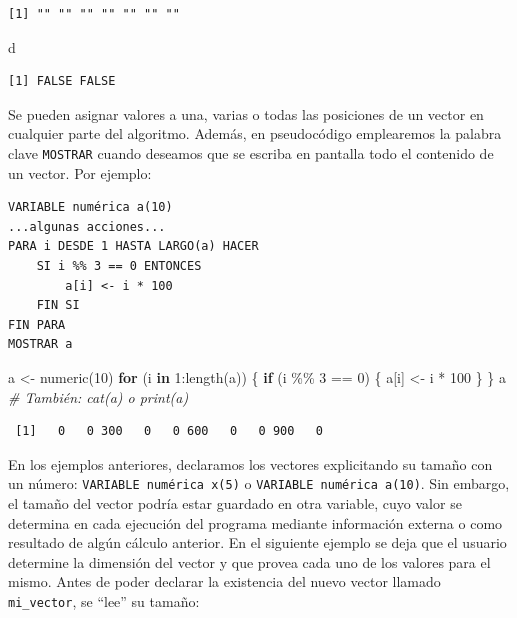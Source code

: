 \documentclass[
]{book}
\newenvironment{Shaded}{\begin{snugshade}}{\end{snugshade}}
\newcommand{\CommentTok}[1]{\textcolor[rgb]{0.56,0.35,0.01}{\textit{#1}}}
\newcommand{\ControlFlowTok}[1]{\textcolor[rgb]{0.13,0.29,0.53}{\textbf{#1}}}
\newcommand{\DecValTok}[1]{\textcolor[rgb]{0.00,0.00,0.81}{#1}}
\newcommand{\FunctionTok}[1]{\textcolor[rgb]{0.00,0.00,0.00}{#1}}
\newcommand{\NormalTok}[1]{#1}
\newcommand{\OtherTok}[1]{\textcolor[rgb]{0.56,0.35,0.01}{#1}}
\newcommand{\SpecialCharTok}[1]{\textcolor[rgb]{0.00,0.00,0.00}{#1}}
\begin{document}
\begin{verbatim}
[1] "" "" "" "" "" "" ""
\end{verbatim}

\begin{Shaded}
\begin{Highlighting}[]
\NormalTok{d}
\end{Highlighting}
\end{Shaded}

\begin{verbatim}
[1] FALSE FALSE
\end{verbatim}

Se pueden asignar valores a una, varias o todas las posiciones de un vector en cualquier parte del algoritmo. Además, en pseudocódigo emplearemos la palabra clave \texttt{MOSTRAR} cuando deseamos que se escriba en pantalla todo el contenido de un vector. Por ejemplo:

\begin{verbatim}
VARIABLE numérica a(10)
...algunas acciones...
PARA i DESDE 1 HASTA LARGO(a) HACER
    SI i %% 3 == 0 ENTONCES  
        a[i] <- i * 100
    FIN SI
FIN PARA
MOSTRAR a
\end{verbatim}

\begin{Shaded}
\begin{Highlighting}[]
\NormalTok{a }\OtherTok{\textless{}{-}} \FunctionTok{numeric}\NormalTok{(}\DecValTok{10}\NormalTok{)}
\ControlFlowTok{for}\NormalTok{ (i }\ControlFlowTok{in} \DecValTok{1}\SpecialCharTok{:}\FunctionTok{length}\NormalTok{(a)) \{}
    \ControlFlowTok{if}\NormalTok{ (i }\SpecialCharTok{\%\%} \DecValTok{3} \SpecialCharTok{==} \DecValTok{0}\NormalTok{) \{}
\NormalTok{        a[i] }\OtherTok{\textless{}{-}}\NormalTok{ i }\SpecialCharTok{*} \DecValTok{100}
\NormalTok{    \}}
\NormalTok{\}}
\NormalTok{a       }\CommentTok{\# También: cat(a) o print(a)}
\end{Highlighting}
\end{Shaded}

\begin{verbatim}
 [1]   0   0 300   0   0 600   0   0 900   0
\end{verbatim}

En los ejemplos anteriores, declaramos los vectores explicitando su tamaño con un número: \texttt{VARIABLE\ numérica\ x(5)} o \texttt{VARIABLE\ numérica\ a(10)}. Sin embargo, el tamaño del vector podría estar guardado en otra variable, cuyo valor se determina en cada ejecución del programa mediante información externa o como resultado de algún cálculo anterior. En el siguiente ejemplo se deja que el usuario determine la dimensión del vector y que provea cada uno de los valores para el mismo. Antes de poder declarar la existencia del nuevo vector llamado \texttt{mi\_vector}, se ``lee'' su tamaño:
\end{document}
